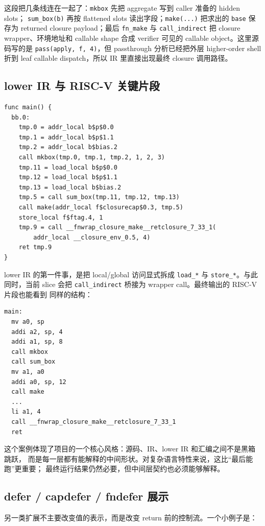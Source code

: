 \documentclass[UTF8,a4paper,11pt]{ctexart}
\begin{document}
这段把几条线连在一起了：\texttt{mkbox} 先把 aggregate 写到 caller 准备的 hidden slots；
\texttt{sum\_box(b)} 再按 flattened slots 读出字段；\texttt{make(...)} 把求出的
\texttt{base} 保存为 returned closure payload；最后 \texttt{fn\_make} 与
\texttt{call\_indirect} 把 closure wrapper、环境地址和 callable shape 合成 verifier 可见的
callable object。这里源码写的是 \texttt{pass(apply, f, 4)}，但 passthrough 分析已经把外层
higher-order shell 折到 leaf callable dispatch，所以 IR 里直接出现最终 closure 调用路径。

\subsection{lower IR 与 RISC-V 关键片段}

\begin{lstlisting}[language={}]
func main() {
  bb.0:
    tmp.0 = addr_local b$p$0.0
    tmp.1 = addr_local b$p$1.1
    tmp.2 = addr_local b$bias.2
    call mkbox(tmp.0, tmp.1, tmp.2, 1, 2, 3)
    tmp.11 = load_local b$p$0.0
    tmp.12 = load_local b$p$1.1
    tmp.13 = load_local b$bias.2
    tmp.5 = call sum_box(tmp.11, tmp.12, tmp.13)
    call make(addr_local f$closurecap$0.3, tmp.5)
    store_local f$ftag.4, 1
    tmp.9 = call __fnwrap_closure_make__retclosure_7_33_1(
        addr_local __closure_env_0.5, 4)
    ret tmp.9
}
\end{lstlisting}

lower IR 的第一件事，是把 local/global 访问显式拆成
\texttt{load\_*} 与 \texttt{store\_*}。与此同时，当前 slice 会把
\texttt{call\_indirect} 桥接为 wrapper call。最终输出的 RISC-V 片段也能看到
同样的结构：

\begin{lstlisting}[language={}]
main:
  mv a0, sp
  addi a2, sp, 4
  addi a1, sp, 8
  call mkbox
  call sum_box
  mv a1, a0
  addi a0, sp, 12
  call make
  ...
  li a1, 4
  call __fnwrap_closure_make__retclosure_7_33_1
  ret
\end{lstlisting}

这个案例体现了项目的一个核心风格：源码、IR、lower IR 和汇编之间不是黑箱跳跃，
而是每一层都有能解释的中间形状。对复杂语言特性来说，这比“最后能跑”更重要；
最终运行结果仍然必要，但中间层契约也必须能够解释。

\subsection{defer / capdefer / fndefer 展示}

另一类扩展不主要改变值的表示，而是改变 return 前的控制流。一个小例子是：
\end{document}
